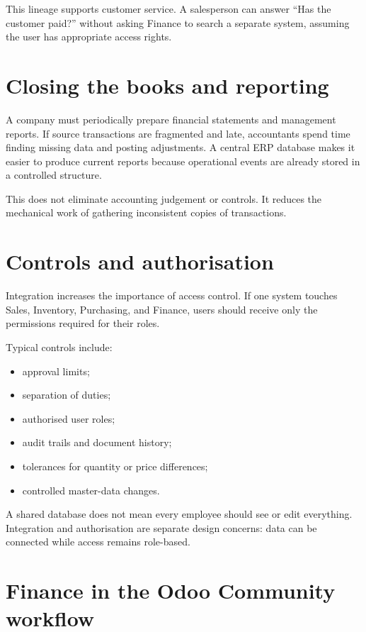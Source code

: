 This lineage supports customer service. A salesperson can answer ``Has the customer paid?'' without asking Finance to search a separate system, assuming the user has appropriate access rights.

\section{Closing the books and reporting}

A company must periodically prepare financial statements and management reports. If source transactions are fragmented and late, accountants spend time finding missing data and posting adjustments. A central ERP database makes it easier to produce current reports because operational events are already stored in a controlled structure.

This does not eliminate accounting judgement or controls. It reduces the mechanical work of gathering inconsistent copies of transactions.

\section{Controls and authorisation}

Integration increases the importance of access control. If one system touches Sales, Inventory, Purchasing, and Finance, users should receive only the permissions required for their roles.

Typical controls include:

\begin{itemize}
  \item approval limits;
  \item separation of duties;
  \item authorised user roles;
  \item audit trails and document history;
  \item tolerances for quantity or price differences;
  \item controlled master-data changes.
\end{itemize}

\begin{pitfall}
A shared database does not mean every employee should see or edit everything. Integration and authorisation are separate design concerns: data can be connected while access remains role-based.
\end{pitfall}

\section{Finance in the Odoo Community workflow}


